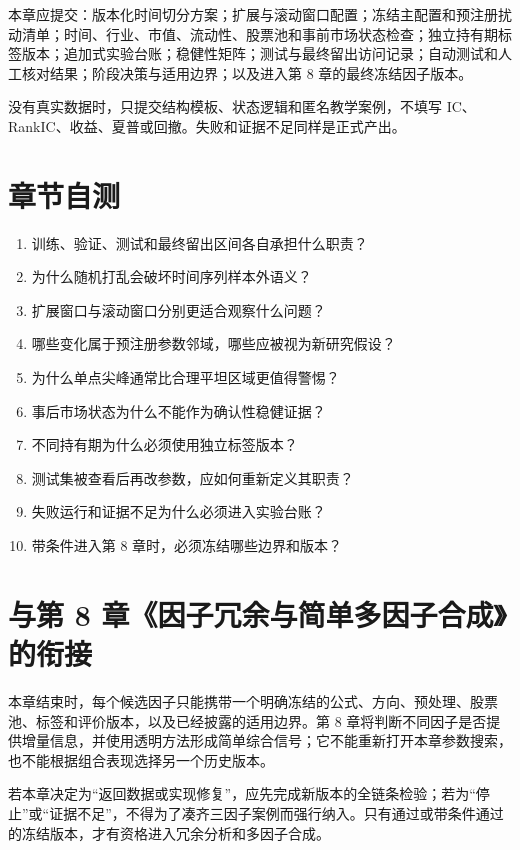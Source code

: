 \begin{outputbox}
本章应提交：版本化时间切分方案；扩展与滚动窗口配置；冻结主配置和预注册扰动清单；时间、行业、市值、流动性、股票池和事前市场状态检查；独立持有期标签版本；追加式实验台账；稳健性矩阵；测试与最终留出访问记录；自动测试和人工核对结果；阶段决策与适用边界；以及进入第 8 章的最终冻结因子版本。
\end{outputbox}

没有真实数据时，只提交结构模板、状态逻辑和匿名教学案例，不填写 IC、RankIC、收益、夏普或回撤。失败和证据不足同样是正式产出。

\section{章节自测}

\begin{quizbox}
\begin{enumerate}
  \item 训练、验证、测试和最终留出区间各自承担什么职责？
  \item 为什么随机打乱会破坏时间序列样本外语义？
  \item 扩展窗口与滚动窗口分别更适合观察什么问题？
  \item 哪些变化属于预注册参数邻域，哪些应被视为新研究假设？
  \item 为什么单点尖峰通常比合理平坦区域更值得警惕？
  \item 事后市场状态为什么不能作为确认性稳健证据？
  \item 不同持有期为什么必须使用独立标签版本？
  \item 测试集被查看后再改参数，应如何重新定义其职责？
  \item 失败运行和证据不足为什么必须进入实验台账？
  \item 带条件进入第 8 章时，必须冻结哪些边界和版本？
\end{enumerate}
\end{quizbox}

\section{与第 8 章《因子冗余与简单多因子合成》的衔接}

本章结束时，每个候选因子只能携带一个明确冻结的公式、方向、预处理、股票池、标签和评价版本，以及已经披露的适用边界。第 8 章将判断不同因子是否提供增量信息，并使用透明方法形成简单综合信号；它不能重新打开本章参数搜索，也不能根据组合表现选择另一个历史版本。

若本章决定为“返回数据或实现修复”，应先完成新版本的全链条检验；若为“停止”或“证据不足”，不得为了凑齐三因子案例而强行纳入。只有通过或带条件通过的冻结版本，才有资格进入冗余分析和多因子合成。
